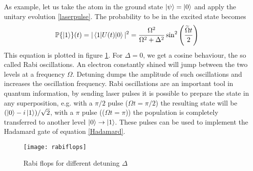As example, let us take the atom in the ground state $\ket{\psi} = \ket{0}$ and apply the unitary evolution \eqref{laserpulse}. The probability to be in the excited state becomes
\begin{equation}
\mathbb{P}\{\ket{1}\}(t) = |\braket{1|U(t)|0}|^2 = \frac{\Omega^2}{\Omega^2+\Delta^2} \sin^2\left(\frac{\widetilde{\Omega}t}{2} \right)
\end{equation}
This equation is plotted in figure \ref{rabiflops}. For $\Delta = 0$, we get a cosine behaviour, the so called Rabi oscillations. An electron constantly shined will jump between the two levels at a frequency $\Omega$. Detuning dumps the amplitude of such oscillations and increases the oscillation frequency. Rabi oscillations are an important tool in quantum information, by sending laser pulses it is possible to prepare the state in any superposition, e.g. with a $\pi/2$ pulse ($\Omega t = \pi/2$) the resulting state will be $(\ket{0} - i\ket{1})/\sqrt{2}$, with a $\pi$ pulse (($\Omega t = \pi$)) the population is completely transferred to another level $\ket{0}\to \ket{1}$. These pulses can be used to implement the Hadamard gate of equation \eqref{Hadamard}.
\begin{figure}[H]
\centering
\texttt{[image: rabiflops]}
\caption{Rabi flops for different detuning $\Delta$}
\label{rabiflops}
\end{figure}

